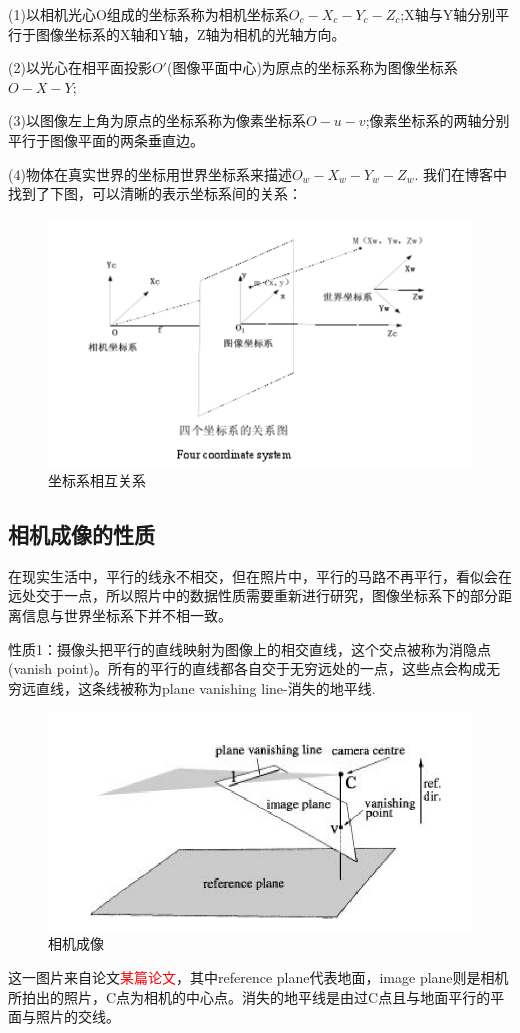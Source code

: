 (1)以相机光心O组成的坐标系称为相机坐标系$O_c-X_c-Y_c-Z_c$;X轴与Y轴分别平行于图像坐标系的X轴和Y轴，Z轴为相机的光轴方向。

(2)以光心在相平面投影$O'$(图像平面中心)为原点的坐标系称为图像坐标系$O-X-Y$;

(3)以图像左上角为原点的坐标系称为像素坐标系$O-u-v$;像素坐标系的两轴分别平行于图像平面的两条垂直边。

(4)物体在真实世界的坐标用世界坐标系来描述$O_w-X_w-Y_w-Z_w$.
我们在博客中找到了下图，可以清晰的表示坐标系间的关系：
\begin{figure}[H]
    \centering
    \includegraphics[scale=1]{figures/坐标系相互关系.png}
    \caption{坐标系相互关系}
    \label{fig:p5}
\end{figure}

\subsection{相机成像的性质}
在现实生活中，平行的线永不相交，但在照片中，平行的马路不再平行，看似会在远处交于一点，所以照片中的数据性质需要重新进行研究，图像坐标系下的部分距离信息与世界坐标系下并不相一致。

性质1：摄像头把平行的直线映射为图像上的相交直线，这个交点被称为消隐点(vanish point)。所有的平行的直线都各自交于无穷远处的一点，这些点会构成无穷远直线，这条线被称为plane vanishing line-消失的地平线.
\begin{figure}[H]
    \centering
    \includegraphics[scale=1]{figures/相机成像.png}
    \caption{相机成像}
    \label{fig:p6}
\end{figure}
这一图片来自论文\textcolor{red}{某篇论文}，其中reference plane代表地面，image plane则是相机所拍出的照片，C点为相机的中心点。消失的地平线是由过C点且与地面平行的平面与照片的交线。

